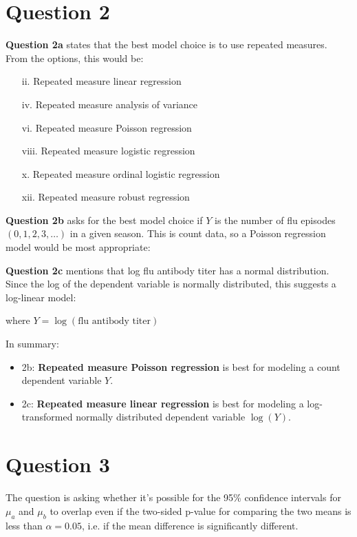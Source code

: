 \documentclass{article}
\begin{document}
\section{Question 2}

\textbf{Question 2a }states that the best model choice is to use repeated measures. From the options, this would be:
\begin{enumerate}
\item[ii.] Repeated measure linear regression
\item[iv.] Repeated measure analysis of variance
\item[vi.] Repeated measure Poisson regression 
\item[viii.] Repeated measure logistic regression
\item[x.] Repeated measure ordinal logistic regression
\item[xii.] Repeated measure robust regression
\end{enumerate}

\textbf{Question 2b} asks for the best model choice if $Y$ is the number of flu episodes $(0,1,2,3,\ldots)$ in a given season. This is count data, so a Poisson regression model would be most appropriate:
\begin{center}
\end{center}

\textbf{Question 2c} mentions that log flu antibody titer has a normal distribution. Since the log of the dependent variable is normally distributed, this suggests a log-linear model:
\begin{center}
\end{center}
where $Y = \log(\text{flu antibody titer})$

In summary:
\begin{itemize}
\item 2b: \textbf{Repeated measure Poisson regression} is best for modeling a count dependent variable $Y$.
\item 2c: \textbf{Repeated measure linear regression} is best for modeling a log-transformed normally distributed dependent variable $\log(Y)$.
\end{itemize}

\section{Question 3}

The question is asking whether it's possible for the 95\% confidence intervals for $\mu_a$ and $\mu_b$ to overlap even if the two-sided p-value for comparing the two means is less than $\alpha=0.05$, i.e. if the mean difference is significantly different.
\end{document}

